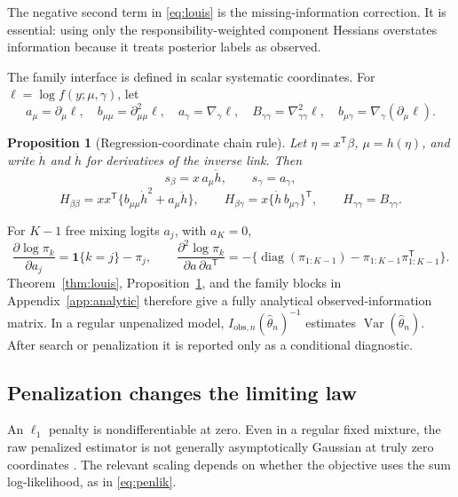\documentclass[a4paper,fleqn]{cas-sc}
\newtheorem{proposition}[theorem]{Proposition}
\DeclareMathOperator{\diag}{diag}
\DeclareMathOperator{\Var}{Var}
\newcommand{\ind}{\mathbf 1}
\newcommand{\T}{\mathsf T}
\begin{document}
The negative second term in \eqref{eq:louis} is the missing-information correction. It is essential: using only the responsibility-weighted component Hessians overstates information because it treats posterior labels as observed.

The family interface is defined in scalar systematic coordinates. For $\ell=\log f(y;\mu,\gamma)$, let
\[
 a_\mu=\partial_\mu\ell,\quad b_{\mu\mu}=\partial_{\mu\mu}^2\ell,
 \quad a_\gamma=\nabla_\gamma\ell,\quad
 B_{\gamma\gamma}=\nabla_{\gamma\gamma}^2\ell,
 \quad b_{\mu\gamma}=\nabla_\gamma(\partial_\mu\ell).
\]

\begin{proposition}[Regression-coordinate chain rule]
\label{prop:chain}
Let $\eta=x^\T\beta$, $\mu=h(\eta)$, and write $\dot h$ and $\ddot h$ for derivatives of the inverse link. Then
\[
 s_\beta=x\,a_\mu\dot h,\qquad s_\gamma=a_\gamma,
\]
\[
 H_{\beta\beta}=xx^\T\{b_{\mu\mu}\dot h^2+a_\mu\ddot h\},\qquad
 H_{\beta\gamma}=x\{\dot h\,b_{\mu\gamma}\}^\T,
 \qquad H_{\gamma\gamma}=B_{\gamma\gamma}.
\]
\end{proposition}

For $K-1$ free mixing logits $a_j$, with $a_K=0$,
\[
 \frac{\partial\log\pi_k}{\partial a_j}=\ind\{k=j\}-\pi_j,
 \qquad
 \frac{\partial^2\log\pi_k}{\partial a\,\partial a^\T}
 =-\{\diag(\pi_{1:K-1})-\pi_{1:K-1}\pi_{1:K-1}^\T\}.
\]
Theorem~\ref{thm:louis}, Proposition~\ref{prop:chain}, and the family blocks in Appendix~\ref{app:analytic} therefore give a fully analytical observed-information matrix. In a regular unpenalized model, $I_{\mathrm{obs},n}(\widehat\theta_n)^{-1}$ estimates $\Var(\widehat\theta_n)$. After search or penalization it is reported only as a conditional diagnostic.

\subsection{Penalization changes the limiting law}
\label{sec:penalty-theory}

An $\ell_1$ penalty is nondifferentiable at zero. Even in a regular fixed mixture, the raw penalized estimator is not generally asymptotically Gaussian at truly zero coordinates \citep{knight2000asymptotics,leeb2005selection}. The relevant scaling depends on whether the objective uses the sum log-likelihood, as in \eqref{eq:penlik}.
\end{document}
